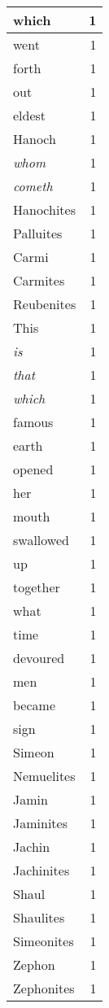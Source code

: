 \begin{center}
\begin{longtable}{l|r}
which & 1\\ \hline 
went & 1\\ \hline 
forth & 1\\ \hline 
out & 1\\ \hline 
eldest & 1\\ \hline 
Hanoch & 1\\ \hline 
\emph{whom} & 1\\ \hline 
\emph{cometh} & 1\\ \hline 
Hanochites & 1\\ \hline 
Palluites & 1\\ \hline 
Carmi & 1\\ \hline 
Carmites & 1\\ \hline 
Reubenites & 1\\ \hline 
This & 1\\ \hline 
\emph{is} & 1\\ \hline 
\emph{that} & 1\\ \hline 
\emph{which} & 1\\ \hline 
famous & 1\\ \hline 
earth & 1\\ \hline 
opened & 1\\ \hline 
her & 1\\ \hline 
mouth & 1\\ \hline 
swallowed & 1\\ \hline 
up & 1\\ \hline 
together & 1\\ \hline 
what & 1\\ \hline 
time & 1\\ \hline 
devoured & 1\\ \hline 
men & 1\\ \hline 
became & 1\\ \hline 
sign & 1\\ \hline 
Simeon & 1\\ \hline 
Nemuelites & 1\\ \hline 
Jamin & 1\\ \hline 
Jaminites & 1\\ \hline 
Jachin & 1\\ \hline 
Jachinites & 1\\ \hline 
Shaul & 1\\ \hline 
Shaulites & 1\\ \hline 
Simeonites & 1\\ \hline 
Zephon & 1\\ \hline 
Zephonites & 1\\ \hline 

\end{longtable}
\end{center}
